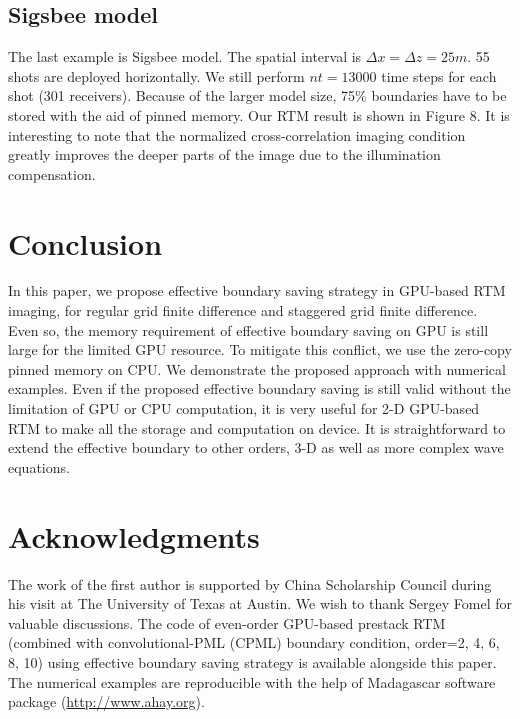 \subsection{Sigsbee model}

The last example is Sigsbee model. The spatial interval is  $\Delta x=\Delta z=25m$. 55 shots are deployed horizontally. We still perform $nt=13000$ time steps for each shot (301 receivers). Because of the larger model size, 75\% boundaries have to be stored with the aid of pinned memory. Our RTM result is shown in Figure 8. It is interesting to note that the normalized cross-correlation imaging condition greatly improves the deeper parts of the image due to the illumination compensation.


\section{Conclusion}

In this paper, we propose effective boundary saving strategy in GPU-based RTM imaging, for regular grid finite difference and staggered grid finite difference. Even so, the memory requirement of effective boundary saving on GPU is still large for the limited GPU resource. To mitigate this conflict, we use the zero-copy pinned memory on CPU. We demonstrate the proposed approach with numerical examples. Even if the proposed effective boundary saving is still valid without the limitation of GPU or CPU computation, it is very useful for 2-D GPU-based RTM to make all the storage and computation on device. It is straightforward to extend the effective boundary to other orders, 3-D as well as more complex wave equations.


\section{Acknowledgments}

The work of the first author is supported by China Scholarship Council during his visit at The University of Texas at Austin. We wish to thank Sergey Fomel for valuable discussions. The code of even-order GPU-based prestack RTM (combined with convolutional-PML (CPML) boundary condition, order=2, 4, 6, 8, 10) using effective boundary saving strategy is available alongside this paper. The numerical examples are reproducible with the help of Madagascar software package \citep{m8r} (\url{http://www.ahay.org}).

